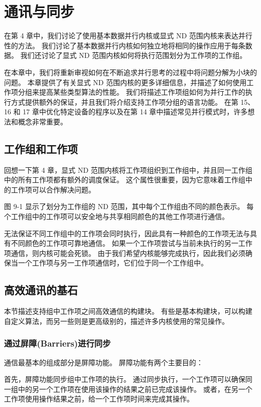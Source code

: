 \section{通讯与同步}
在第 4 章中，我们讨论了使用基本数据并行内核或显式 ND 范围内核来表达并行性的方法。 
我们讨论了基本数据并行内核如何独立地将相同的操作应用于每条数据。 
我们还讨论了显式 ND 范围内核如何将执行范围划分为工作项的工作组。

在本章中，我们将重新审视如何在不断追求并行思考的过程中将问题分解为小块的问题。 
本章提供了有关显式 ND 范围内核的更多详细信息，并描述了如何使用工作项分组来提高某些类型算法的性能。 
我们将描述工作项组如何为并行工作的执行方式提供额外的保证，并且我们将介绍支持工作项分组的语言功能。 
在第 15、16 和 17 章中优化特定设备的程序以及在第 14 章中描述常见并行模式时，许多想法和概念非常重要。

\subsection{工作组和工作项}
回想一下第 4 章，显式 ND 范围内核将工作项组织到工作组中，并且同一工作组中的所有工作项都有额外的调度保证。 
这个属性很重要，因为它意味着工作组中的工作项可以合作解决问题。

图 9-1 显示了划分为工作组的 ND 范围，其中每个工作组由不同的颜色表示。 
每个工作组中的工作项可以安全地与共享相同颜色的其他工作项进行通信。

无法保证不同工作组中的工作项会同时执行，因此具有一种颜色的工作项无法与具有不同颜色的工作项可靠地通信。 
如果一个工作项尝试与当前未执行的另一工作项通信，则内核可能会死锁。 
由于我们希望内核能够完成执行，因此我们必须确保当一个工作项与另一工作项通信时，它们位于同一个工作组中。

\subsection{高效通讯的基石}
本节描述支持组中工作项之间高效通信的构建块。 
有些是基本构建块，可以构建自定义算法，而另一些则是更高级别的，描述许多内核使用的常见操作。

\subsubsection{通过屏障(Barriers)进行同步}
通信最基本的组成部分是屏障功能。 屏障功能有两个主要目的：

首先，屏障功能同步组中工作项的执行。 
通过同步执行，一个工作项可以确保同一组中的另一个工作项在使用该操作的结果之前已完成该操作。 
或者，在另一个工作项使用操作结果之前，给一个工作项时间来完成其操作。

